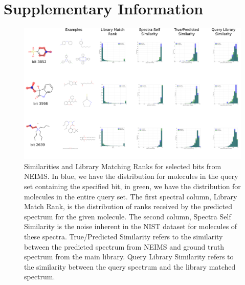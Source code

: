 \section{Supplementary Information}
\begin{figure}[h]
    \centering
    \includegraphics[width=0.95\linewidth]{./figures/bit_analysis.png}
        \caption[Bit Analysis of NEIMS]{Similarities and Library Matching Ranks for selected bits from NEIMS. In blue, we have the distribution for molecules in the query set containing the specified bit, in green, we have the distribution for molecules in the entire query set. The first spectral column, Library Match Rank, is the distribution of ranks received by the predicted spectrum for the given molecule. The second column, Spectra Self Similarity is the noise inherent in the NIST dataset for molecules of these spectra. True/Predicted Similarity refers to the similarity between the predicted spectrum from NEIMS and ground truth spectrum from the main library. Query Library Similarity refers to the similarity between the query spectrum and the library matched spectrum.}
    \label{fig:bit_analysis}
\end{figure}


